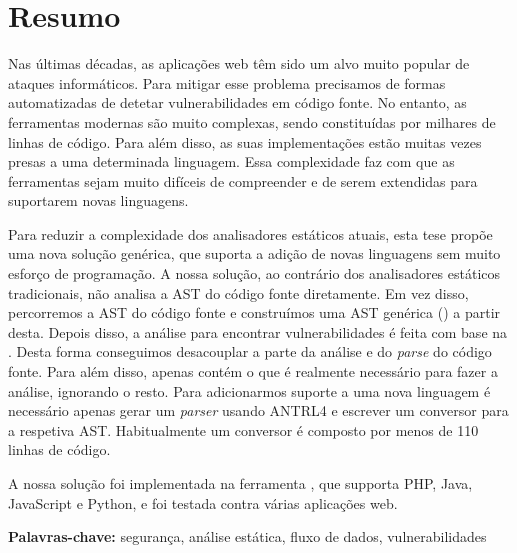 
\section*{Resumo}


Nas últimas décadas, as aplicações web têm sido um alvo muito popular de ataques informáticos. Para mitigar esse problema precisamos de formas automatizadas de detetar vulnerabilidades em código fonte. No entanto, as ferramentas modernas são muito complexas, sendo constituídas por milhares de linhas de código. Para além disso, as suas implementações estão muitas vezes presas a uma determinada linguagem. Essa complexidade faz com que as ferramentas sejam muito difíceis de compreender e de serem extendidas para suportarem novas linguagens.


Para reduzir a complexidade dos analisadores estáticos atuais, esta tese propõe uma nova solução genérica, que suporta a adição de novas linguagens sem muito esforço de programação. A nossa solução, ao contrário dos analisadores estáticos tradicionais, não analisa a AST do código fonte diretamente. Em vez disso, percorremos a AST do código fonte e construímos uma AST genérica (\astname{}) a partir desta. Depois disso, a análise para encontrar vulnerabilidades é feita com base na \astname{}. Desta forma conseguimos desacouplar a parte da análise e do \textit{parse} do código fonte. Para além disso, \astname{} apenas contém o que é realmente necessário para fazer a análise, ignorando o resto. Para adicionarmos suporte a uma nova linguagem é necessário apenas gerar um \textit{parser} usando ANTRL4 \cite{antlr4book} e escrever um conversor para a respetiva AST. Habitualmente um conversor é composto por menos de 110 linhas de código.

A nossa solução foi implementada na ferramenta \toolname{}, que supporta PHP, Java, JavaScript e Python, e foi testada contra várias aplicações web.

\vfill

\textbf{\Large Palavras-chave:} segurança, análise estática, fluxo de dados, vulnerabilidades

